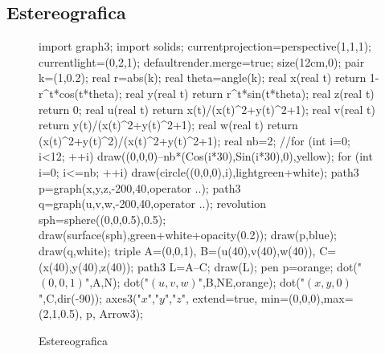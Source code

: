 \subsection{Estereografica}
\begin{figure}[!ht]
	\centering
	\begin{asy}
import graph3;
import solids;
currentprojection=perspective(1,1,1);
currentlight=(0,2,1);
defaultrender.merge=true;
size(12cm,0);
pair k=(1,0.2);
real r=abs(k);
real theta=angle(k);
real x(real t) { return 1-r^t*cos(t*theta); }
real y(real t) { return r^t*sin(t*theta); }
real z(real t) { return 0; }
real u(real t) { return x(t)/(x(t)^2+y(t)^2+1); }
real v(real t) { return y(t)/(x(t)^2+y(t)^2+1); }
real w(real t) { return (x(t)^2+y(t)^2)/(x(t)^2+y(t)^2+1); }
real nb=2;
//for (int i=0; i<12; ++i) draw((0,0,0)--nb*(Cos(i*30),Sin(i*30),0),yellow);
for (int i=0; i<=nb; ++i) draw(circle((0,0,0),i),lightgreen+white);
path3 p=graph(x,y,z,-200,40,operator ..);
path3 q=graph(u,v,w,-200,40,operator ..);
revolution sph=sphere((0,0,0.5),0.5);
draw(surface(sph),green+white+opacity(0.2));
draw(p,blue);
draw(q,white);
triple
A=(0,0,1),
B=(u(40),v(40),w(40)),
C=(x(40),y(40),z(40));
path3 L=A--C;
draw(L);
pen p=orange;
dot("$(0,0,1)$",A,N);
dot("$(u,v,w)$",B,NE,orange);
dot("$(x,y,0)$",C,dir(-90));
axes3("$x$","$y$","$z$", extend=true, min=(0,0,0),max=(2,1,0.5), p, Arrow3);
	\end{asy}
	\caption{Estereografica}
\end{figure}
